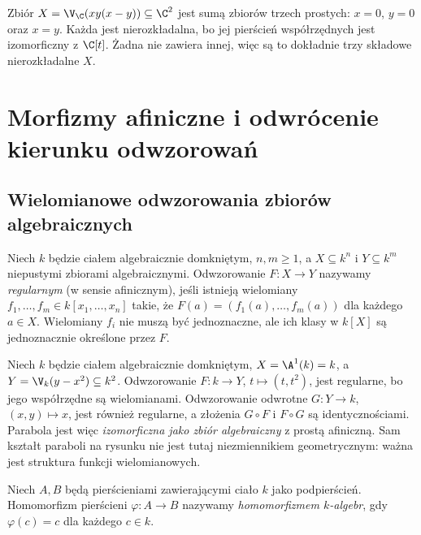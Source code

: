 \begin{przyklad}
Zbiór $X=\V_{\C}(xy(x-y))\subseteq\C^2$
jest sumą zbiorów trzech prostych: $x=0$, $y=0$ oraz $x=y$.
Każda jest nierozkładalna, bo jej pierścień współrzędnych
jest izomorficzny z $\C[t]$. Żadna nie zawiera innej,
więc są to dokładnie trzy składowe nierozkładalne $X$.
\end{przyklad}

\section{Morfizmy afiniczne i odwrócenie kierunku odwzorowań}

\subsection{Wielomianowe odwzorowania zbiorów algebraicznych}

\begin{definicja}
Niech $k$ będzie ciałem algebraicznie domkniętym, $n,m\ge1$,
a $X\subseteq k^n$ i $Y\subseteq k^m$ niepustymi zbiorami algebraicznymi.
Odwzorowanie $F:X\to Y$ nazywamy \emph{regularnym} (w sensie
afinicznym), jeśli istnieją wielomiany
$f_1,\dots,f_m\in k[x_1,\dots,x_n]$ takie, że
$F(a)=(f_1(a),\dots,f_m(a))$ dla każdego $a\in X$.
Wielomiany $f_i$ nie muszą być jednoznaczne, ale ich klasy w $k[X]$
są jednoznacznie określone przez $F$.
\end{definicja}

\begin{przyklad}
Niech $k$ będzie ciałem algebraicznie domkniętym,
$X=\A^1(k)=k$, a $Y=\V_k(y-x^2)\subseteq k^2$.
Odwzorowanie $F:k\to Y$, $t\mapsto(t,t^2)$, jest regularne,
bo jego współrzędne są wielomianami. Odwzorowanie odwrotne
$G:Y\to k$, $(x,y)\mapsto x$, jest również regularne,
a złożenia $G\circ F$ i $F\circ G$ są identycznościami.
Parabola jest więc \emph{izomorficzna jako zbiór algebraiczny}
z prostą afiniczną. Sam kształt paraboli na rysunku nie jest
tutaj niezmiennikiem geometrycznym: ważna jest struktura funkcji
wielomianowych.
\end{przyklad}

\begin{definicja}
Niech $A,B$ będą pierścieniami zawierającymi ciało $k$ jako podpierścień.
Homomorfizm pierścieni $\varphi:A\to B$ nazywamy
\emph{homomorfizmem $k$-algebr}, gdy $\varphi(c)=c$
dla każdego $c\in k$.
\end{definicja}

